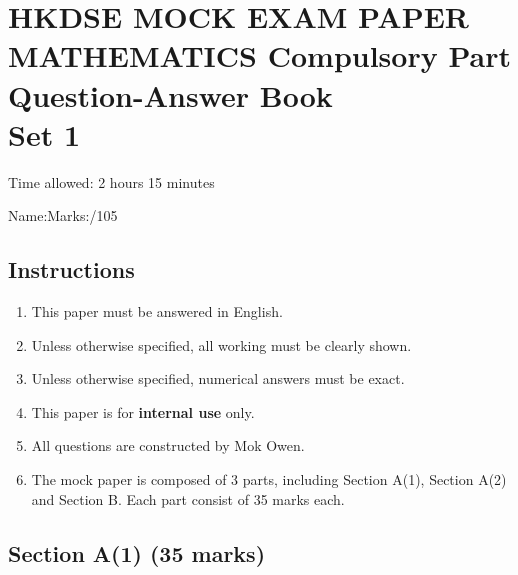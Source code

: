 \documentclass[12pt]{article}
\begin{document}
    \thispagestyle{plain}

    \centering 

    \section*{HKDSE MOCK EXAM PAPER\\MATHEMATICS Compulsory Part\\Question-Answer Book\\Set 1}

    Time allowed: 2 hours 15 minutes

    Name:\hrulefill \hfill Marks:\hrulefill/105

    \raggedright

    \subsection*{Instructions}

    \begin{enumerate}
        \item This paper must be answered in English.
        \item Unless otherwise specified, all working must be clearly shown.
        \item Unless otherwise specified, numerical answers must be exact.
        \item This paper is for \textbf{internal use} only.
        \item All questions are constructed by Mok Owen.
        \item The mock paper is composed of 3 parts, including Section A(1), Section A(2) and Section B. Each part consist of 35 marks each.
    \end{enumerate}

    \newpage

    \subsection*{Section A(1) (35 marks)}
\end{document}
